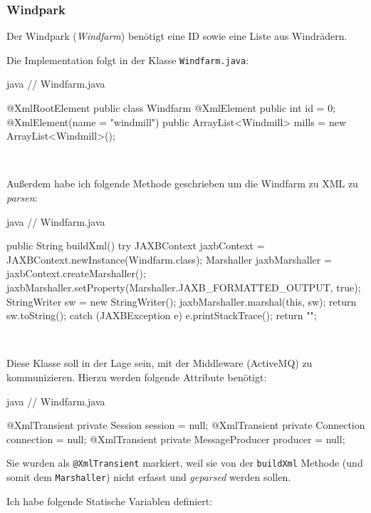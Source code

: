 \clearpage
\subsubsection{Windpark}
\label{sec:windfarm}

Der Windpark (\textit{Windfarm}) benötigt eine ID sowie eine Liste aus Windrädern.

Die Implementation folgt in der Klasse \texttt{Windfarm.java}:

\begin{code}{java}
// Windfarm.java

@XmlRootElement
public class Windfarm {
    @XmlElement
    public int id = 0;
    @XmlElement(name = "windmill")
    public ArrayList<Windmill> mills = new ArrayList<Windmill>();
}
\end{code}

\

Außerdem habe ich folgende Methode geschrieben um die Windfarm zu XML zu \textit{parsen}:

\begin{code}{java}
    // Windfarm.java

    public String buildXml() {
        try {
            JAXBContext jaxbContext = JAXBContext.newInstance(Windfarm.class);
            Marshaller jaxbMarshaller = jaxbContext.createMarshaller();
            jaxbMarshaller.setProperty(Marshaller.JAXB_FORMATTED_OUTPUT, true);
            StringWriter sw = new StringWriter();
            jaxbMarshaller.marshal(this, sw);
            return sw.toString();
        } catch (JAXBException e) {
            e.printStackTrace();
            return "";
        }
    }
\end{code}

\

Diese Klasse soll in der Lage sein, mit der Middleware (ActiveMQ) zu kommunizieren. Hierzu werden folgende Attribute benötigt:

\begin{code}{java}
// Windfarm.java

@XmlTransient
private Session session = null;
@XmlTransient
private Connection connection = null;
@XmlTransient
private MessageProducer producer = null;
\end{code}

Sie wurden als \texttt{@XmlTransient} markiert, weil sie von der \texttt{buildXml} Methode (und somit dem \texttt{Marshaller}) nicht erfasst und \textit{geparsed} werden sollen.

Ich habe folgende Statische Variablen definiert:

